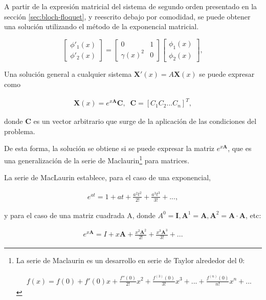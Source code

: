 A partir de la expresión matricial del sistema de segundo orden presentado en la sección \ref{sec:bloch-floquet}, y reescrito debajo por comodidad, se puede obtener una solución utilizando el método de la exponencial matricial.

\begin{equation}
\begin{bmatrix}
\phi'_1(x) \\
\phi'_2(x)
\end{bmatrix}
=
\begin{bmatrix}
0 & 1 \\
\gamma(x)^2 & 0
\end{bmatrix}
\begin{bmatrix}
\phi_1(x) \\
\phi_2(x)
\end{bmatrix},
\end{equation}

Una solución general a cualquier sistema $\textbf{X}'(x) = A \textbf{X}(x)$ se puede expresar como

\begin{align}
	\textbf{X}(x) = e^{x\textbf{A}} \textbf{C}, \;\;\textbf{C} = [C_1 C_2 ... C_n ]^{T},
\end{align}

donde $\textbf{C}$ es un vector arbitrario que surge de la aplicación de las condiciones del problema.

De esta forma, la solución se obtiene si se puede expresar la matriz $e^{x\textbf{A}}$, que es una generalización de la serie de Maclaurin\footnote{La serie de Maclaurin es un desarrollo en serie de Taylor alrededor del 0: 

\begin{align}
	f(x) = f(0) + f'(0) x + \frac{f''(0)}{2!} x^2 + \frac{f^(3)(0)}{3!} x^3 + ... + \frac{f^(n)(0)}{n!} x^n + ...
\end{align}} para matrices.

La serie de MacLaurin establece, para el caso de una exponencial,

\begin{align}
	e^{at} = 1 + at + \frac{a^2 t^2}{2!} + \frac{a^3 t^3}{3!} + ...,
\end{align}

y para el caso de una matriz cuadrada A, donde $A^0 = \textbf{I}, \textbf{A}^1 = \textbf{A}, \textbf{A}^2 = \textbf{A} \cdot \textbf{A}$, etc:

\begin{align}
e^{x\textbf{A}} = I + x\textbf{A} + \frac{x^2 \textbf{A}^2}{2!} + \frac{x^3 \textbf{A}^3}{3!} + ...
\end{align}

